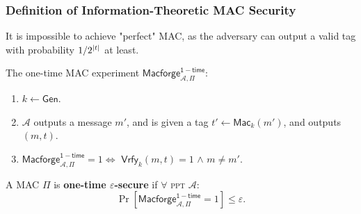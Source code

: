 \begin{frame}\frametitle{Definition of Information-Theoretic MAC Security}
It is impossible to achieve "perfect" MAC, as the adversary can output a valid tag with probability $1/2^{\lvert t\rvert}$ at least.
\newline

The one-time MAC experiment $\mathsf{Macforge}^{\mathsf{1-time}}_{\mathcal{A},\Pi }$:
\begin{enumerate}
\item $k \gets \mathsf{Gen}$.
\item $\mathcal{A}$ outputs a message $m'$, and is given a tag $t' \gets \mathsf{Mac}_k(m')$, and outputs $(m,t)$.
\item $\mathsf{Macforge}^{\mathsf{1-time}}_{\mathcal{A},\Pi }=1 \iff$ $\mathsf{Vrfy}_k(m,t)=1$ $\land$ $m \neq m'$. 
\end{enumerate}
\begin{definition}
A MAC $\Pi$ is \textbf{one-time $\varepsilon$-secure} if $\forall$ \textsc{ppt} $\mathcal{A}$:
\[ \Pr [\mathsf{Macforge}^{\mathsf{1-time}}_{\mathcal{A},\Pi}=1] \le \varepsilon.
\]
\end{definition}
\end{frame}

